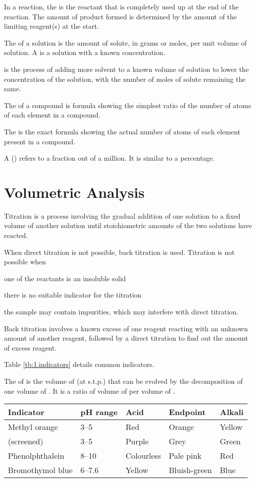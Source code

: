 \documentclass[Chemistry.tex]{subfiles}
\begin{document}
In a reaction, the  is the reactant that is completely used up at the end of the reaction. The amount of product formed is determined by the amount of the limiting reagent(s) at the start.

The  of a solution is the amount of solute, in grams or moles, per unit volume of solution. A  is a solution with a known concentration.

 is the process of adding more solvent to a known volume of solution to lower the concentration of the solution, with the number of moles of solute remaining the same.

The  of a compound is formula showing the simplest ratio of the number of atoms of each element in a compound.

The  is the exact formula showing the actual number of atoms of each element present in a compound.

A  (\si{\ppm}) refers to a fraction out of a million. It is similar to a percentage.
\section{Volumetric Analysis}
Titration is a process involving the gradual addition of one solution to a fixed volume of another solution until stoichiometric amounts of the two solutions have reacted.

When direct titration is not possible, back titration is used. Titration is not possible when \begin{slinenumor}
\item one of the reactants is an insoluble solid
\item there is no suitable indicator for the titration
\item the sample may contain impurities, which may interfere with direct titration.\end{slinenumor}

Back titration involves a known excess of one reagent reacting with an unknown amount of another reagent, followed by a direct titration to find out the amount of excess reagent.

Table \ref{tb:1.indicators} details common indicators.

The  of  is the volume of  (at s.t.p.) that can be evolved by the decomposition of one volume of . It is a ratio of volume of  per volume of .
\begin{table*}\centering\begin{tabular}[c]{lllll}
\toprule
\textbf{Indicator} & \textbf{pH range} & \textbf{Acid} & \textbf{Endpoint} & \textbf{Alkali}\tabularnewline
\midrule
Methyl orange & \numrange{3}{5} & Red & Orange & Yellow\tabularnewline
(screened) & \numrange{3}{5} & Purple & Grey & Green\tabularnewline
Phenolphthalein & \numrange{8}{10} & Colourless & Pale pink & Red\tabularnewline
Bromothymol blue & \numrange{6}{7.6} & Yellow & Bluish-green & Blue\tabularnewline
\bottomrule
\end{tabular}\caption{Common indicators}\label{tb:1.indicators}\end{table*}
\end{document}
